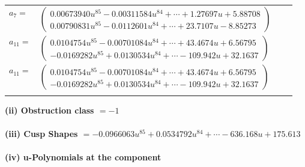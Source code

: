 \documentclass[1p]{elsarticle_modified}
\theoremstyle{definition}
\begin{document}
\begin{tabular}{m{7pt} m{180pt} m{7pt} m{180pt} }
\flushright $a_{7}=$&$\begin{pmatrix}0.00673940 u^{85}-0.00311584 u^{84}+\cdots+1.27697 u+5.88708\\0.00790831 u^{85}-0.0112601 u^{84}+\cdots+23.7107 u-8.85273\end{pmatrix}$ \\
\flushright $a_{11}=$&$\begin{pmatrix}0.0104754 u^{85}-0.00701084 u^{84}+\cdots+43.4674 u+6.56795\\-0.0169282 u^{85}+0.0130534 u^{84}+\cdots-109.942 u+32.1637\end{pmatrix}$\\ \flushright $a_{11}=$&$\begin{pmatrix}0.0104754 u^{85}-0.00701084 u^{84}+\cdots+43.4674 u+6.56795\\-0.0169282 u^{85}+0.0130534 u^{84}+\cdots-109.942 u+32.1637\end{pmatrix}$\\&\end{tabular}
\flushleft \textbf{(ii) Obstruction class $= -1$}\\~\\
\flushleft \textbf{(iii) Cusp Shapes $= -0.0966063 u^{85}+0.0534792 u^{84}+\cdots-636.168 u+175.613$}\\~\\
\newpage\renewcommand{\arraystretch}{1}
\flushleft \textbf{(iv) u-Polynomials at the component}\newline \\
\end{document}
